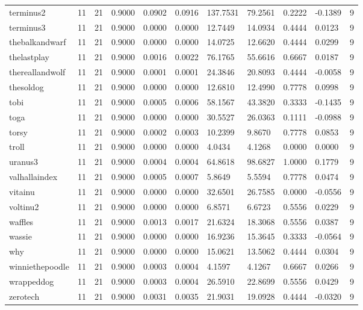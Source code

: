 \begin{table}[htbp]
\begin{tabular}{lllllllllll}
terminus2 & 11 & 21 & 0.9000 & 0.0902 & 0.0916 & 137.7531 & 79.2561 & 0.2222 & -0.1389 & 9 \\
terminus3 & 11 & 21 & 0.9000 & 0.0000 & 0.0000 & 12.7449 & 14.0934 & 0.4444 & 0.0123 & 9 \\
thebalkandwarf & 11 & 21 & 0.9000 & 0.0000 & 0.0000 & 14.0725 & 12.6620 & 0.4444 & 0.0299 & 9 \\
thelastplay & 11 & 21 & 0.9000 & 0.0016 & 0.0022 & 76.1765 & 55.6616 & 0.6667 & 0.0187 & 9 \\
thereallandwolf & 11 & 21 & 0.9000 & 0.0001 & 0.0001 & 24.3846 & 20.8093 & 0.4444 & -0.0058 & 9 \\
thesoldog & 11 & 21 & 0.9000 & 0.0000 & 0.0000 & 12.6810 & 12.4990 & 0.7778 & 0.0998 & 9 \\
tobi & 11 & 21 & 0.9000 & 0.0005 & 0.0006 & 58.1567 & 43.3820 & 0.3333 & -0.1435 & 9 \\
toga & 11 & 21 & 0.9000 & 0.0000 & 0.0000 & 30.5527 & 26.0363 & 0.1111 & -0.0988 & 9 \\
torsy & 11 & 21 & 0.9000 & 0.0002 & 0.0003 & 10.2399 & 9.8670 & 0.7778 & 0.0853 & 9 \\
troll & 11 & 21 & 0.9000 & 0.0000 & 0.0000 & 4.0434 & 4.1268 & 0.0000 & 0.0000 & 9 \\
uranus3 & 11 & 21 & 0.9000 & 0.0004 & 0.0004 & 64.8618 & 98.6827 & 1.0000 & 0.1779 & 9 \\
valhallaindex & 11 & 21 & 0.9000 & 0.0005 & 0.0007 & 5.8649 & 5.5594 & 0.7778 & 0.0474 & 9 \\
vitainu & 11 & 21 & 0.9000 & 0.0000 & 0.0000 & 32.6501 & 26.7585 & 0.0000 & -0.0556 & 9 \\
voltinu2 & 11 & 21 & 0.9000 & 0.0000 & 0.0000 & 6.8571 & 6.6723 & 0.5556 & 0.0229 & 9 \\
waffles & 11 & 21 & 0.9000 & 0.0013 & 0.0017 & 21.6324 & 18.3068 & 0.5556 & 0.0387 & 9 \\
wassie & 11 & 21 & 0.9000 & 0.0000 & 0.0000 & 16.9236 & 15.3645 & 0.3333 & -0.0564 & 9 \\
why & 11 & 21 & 0.9000 & 0.0000 & 0.0000 & 15.0621 & 13.5062 & 0.4444 & 0.0304 & 9 \\
winniethepoodle & 11 & 21 & 0.9000 & 0.0003 & 0.0004 & 4.1597 & 4.1267 & 0.6667 & 0.0266 & 9 \\
wrappeddog & 11 & 21 & 0.9000 & 0.0003 & 0.0004 & 26.5910 & 22.8699 & 0.5556 & 0.0429 & 9 \\
zerotech & 11 & 21 & 0.9000 & 0.0031 & 0.0035 & 21.9031 & 19.0928 & 0.4444 & -0.0320 & 9 \\

\end{tabular}
\end{table}
